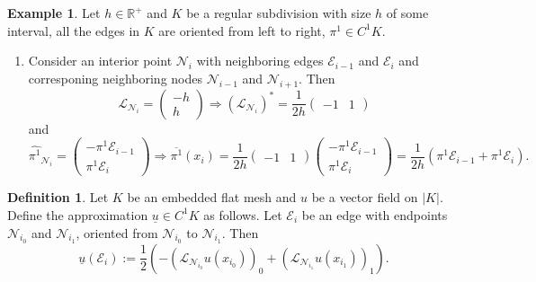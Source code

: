 \documentclass[fleqn]{article}
\theoremstyle{definition}
\newtheorem{definition}[theorem]{Definition}
\newtheorem{example}[theorem]{Example}
\newcommand{\R}{\mathbb{R}}
\begin{document}
\begin{example}
  Let $h \in \R^+$ and $K$ be a regular subdivision with size $h$
  of some interval,
  all the edges in $K$ are oriented from left to right,
  $\pi^1 \in C^1 K$.
  \begin{enumerate}
    \item
      Consider an interior point $\mathcal{N}_i$ with neighboring edges
      $\mathcal{E}_{i - 1}$ and $\mathcal{E}_i$ and corresponing neighboring
      nodes $\mathcal{N}_{i - 1}$ and $\mathcal{N}_{i + 1}$.
      Then
      \begin{equation}
        \mathcal{L}_{\mathcal{N}_i} =
        \begin{pmatrix}
          -h \\
          h
        \end{pmatrix}
        \Rightarrow
        (\mathcal{L}_{\mathcal{N}_i})^* =
          \frac{1}{2 h}
          \begin{pmatrix}
            -1 & 1
          \end{pmatrix}
      \end{equation}
      and
      \begin{equation}
        \widehat{\pi^1}_{\mathcal{N}_i} =
        \begin{pmatrix}
          - \pi^1 \mathcal{E}_{i - 1} \\
          \pi^1 \mathcal{E}_i
        \end{pmatrix}
        \Rightarrow
        \overline{\pi^1}(x_i) =
          \frac{1}{2 h}
          \begin{pmatrix}
            -1 & 1
          \end{pmatrix}
          \begin{pmatrix}
            - \pi^1 \mathcal{E}_{i - 1} \\
            \pi^1 \mathcal{E}_i
          \end{pmatrix}
        = \frac{1}{2 h}
          \left(\pi^1 \mathcal{E}_{i - 1} + \pi^1 \mathcal{E}_i\right).
      \end{equation}
  \end{enumerate}
\end{example}

\begin{definition}
  \label{idec/vector_field_to_1_cochain/definition}
  Let $K$ be an embedded flat mesh and $u$ be a vector field on $|K|$.
  Define the approximation $\underline{u} \in C^1 K$ as follows.
  Let $\mathcal{E}_i$ be an edge with endpoints $\mathcal{N}_{i_0}$ and
  $\mathcal{N}_{i_1}$, oriented from $\mathcal{N}_{i_0}$ to $\mathcal{N}_{i_1}$.
  Then
  \begin{equation}
    \underline{u}(\mathcal{E}_i) :=
      \frac{1}{2}
      ( - (\mathcal{L}_{\mathcal{N}_{i_0}} u(x_{i_0}))_0
        + (\mathcal{L}_{\mathcal{N}_{i_1}} u(x_{i_1}))_1
      ).
  \end{equation}
\end{definition}
\end{document}

